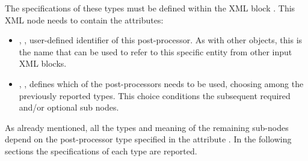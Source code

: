 The specifications of these types must be defined within the XML block
.
%
This XML node needs to contain the attributes:
\vspace{-5mm}
\begin{itemize}
  \itemsep0em
  \item {}, , user-defined
  identifier of this post-processor.
  \nb As with other objects, this is the name that can be used to refer to this
  specific entity from other input XML blocks.
  \item {}, , defines which of
  the post-processors needs to be used, choosing among the previously reported
  types.
  This choice conditions the subsequent required and/or optional
   sub nodes.
\end{itemize}
\vspace{-5mm}

As already mentioned, all the types and meaning of the remaining sub-nodes
depend on the post-processor type specified in the attribute .
%
In the following sections the specifications of each type are reported.



























